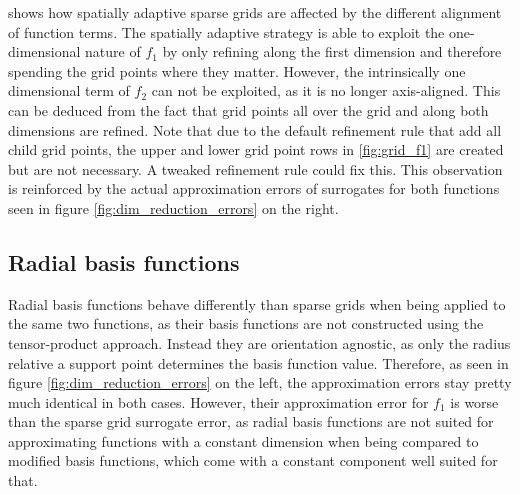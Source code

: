 \documentclass[
  a4paper,  %
  twoside,  %
  bibliography=totoc,
  headsepline,
  cleardoublepage=empty,
  parskip=half,
  draft=false
]{scrbook}
\begin{document}
 shows how spatially adaptive sparse grids are affected by the different alignment of function terms.
The spatially adaptive strategy is able to exploit the one-dimensional nature of $f_1$ by only refining along the first dimension and therefore spending the grid points where they matter.
However, the intrinsically one dimensional term of $f_2$ can not be exploited, as it is no longer axis-aligned.
This can be deduced from the fact that grid points all over the grid and along both dimensions are refined.
Note that due to the default refinement rule that add all child grid points, the upper and lower grid point rows in \cref{fig:grid_f1} are created but are not necessary.
A tweaked refinement rule could fix this.
This observation is reinforced by the actual approximation errors of surrogates for both functions seen in figure \cref{fig:dim_reduction_errors} on the right.

\subsection{Radial basis functions}

Radial basis functions behave differently than sparse grids when being applied to the same two functions, as their basis functions are not constructed using the tensor-product approach.
Instead they are orientation agnostic, as only the radius relative a support point determines the basis function value.
Therefore, as seen in figure \cref{fig:dim_reduction_errors} on the left, the approximation errors stay pretty much identical in both cases.
However, their approximation error for $f_1$ is worse than the sparse grid surrogate error, as radial basis functions are not suited for approximating functions with a constant dimension when being compared to modified basis functions, which come with a constant component well suited for that.
\end{document}
